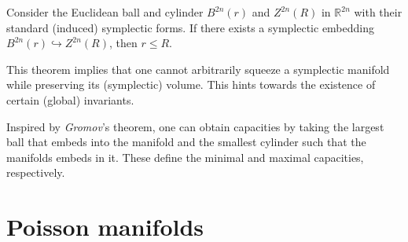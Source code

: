     \begin{theorem}
        Consider the Euclidean ball and cylinder $B^{2n}(r)$ and $Z^{2n}(R)$ in $\mathbb{R}^{2n}$ with their standard (induced) symplectic forms. If there exists a symplectic embedding $B^{2n}(r)\hookrightarrow Z^{2n}(R)$, then $r\leq R$.
    \end{theorem}
    This theorem implies that one cannot arbitrarily squeeze a symplectic manifold while preserving its (symplectic) volume. This hints towards the existence of certain (global) invariants.
    \begin{example}
        Inspired by \textit{Gromov}'s theorem, one can obtain capacities by taking the largest ball that embeds into the manifold and the smallest cylinder such that the manifolds embeds in it. These define the minimal and maximal capacities, respectively.
    \end{example}

\section{Poisson manifolds}\label{section:poisson_manifolds}

